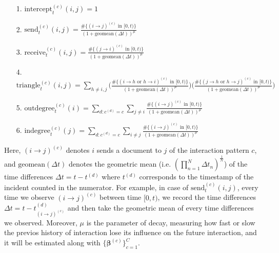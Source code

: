 \documentclass[a4paper]{article}
\begin{document}
 \begin{itemize}[leftmargin=*,rightmargin=-1cm]
 	\item [1.] $\mbox{intercept}^{(c)}_t(i, j) = 1$
 	\item [2.]  $\mbox{send}^{(c)}_t(i, j)= \frac{\#\{(i\rightarrow j)^{(c)} \mbox{ in } [0, t)\}}{(1+\mbox{geomean}(\Delta t))^\mu}$
 	\item [3.] $\mbox{receive}^{(c)}_t(i, j)=\frac{\#\{(j\rightarrow i)^{(c)} \mbox{ in } [0, t)\}}{(1+\mbox{geomean}(\Delta t))^\mu}$
 	\item [4.] $\mbox{triangle}^{(c)}_t(i, j)=\sum\limits_{h \neq i, j}\Big(\frac{\#\{(i\rightarrow h \mbox{ or } h \rightarrow i )^{(c)} \mbox{ in } [0, t)\}}{(1+\mbox{geomean}(\Delta t))^\mu}\Big)\Big(\frac{\#\{(j\rightarrow h \mbox{ or } h \rightarrow j )^{(c)} \mbox{ in } [0, t)\}}{(1+\mbox{geomean}(\Delta t))^\mu}\Big)$
 	\item [5.]  $\mbox{outdegree}^{(c)}_t(i)=\sum\limits_{d: c^{(d)}=c}\sum\limits_{j\neq i}\frac{\#\{(i\rightarrow j)^{(c)} \mbox{ in } [0, t)\}}{(1+\mbox{geomean}(\Delta t))^\mu}$
 	\item [6.] $\mbox{indegree}^{(c)}_t(j)=\sum\limits_{d: c^{(d)}=c}\sum\limits_{i \neq j}\frac{\#\{(i\rightarrow j)^{(c)} \mbox{ in } [0, t)\}}{(1+\mbox{geomean}(\Delta t))^\mu}$
 \end{itemize}
\vspace{3mm}
Here, $(i\rightarrow j)^{(c)}$ denotes $i$ sends a document to $j$ of the interaction pattern $c$, and $\mbox{geomean}(\Delta t)$ denotes the geometric mean (i.e. $(\prod\limits_{n=1}^N\Delta t_n)^{\frac{1}{N}}$) of the time differences $\Delta t=t-t^{(d)}$ where $t^{(d)}$ corresponds to the timestamp of the incident counted in the numerator. For example, in case of $\mbox{send}^{(c)}_t(i, j)$, every time we observe $(i\rightarrow j)^{(c)}$ between time $[0, t)$, we record the time differences $\Delta t=t-t_{(i\rightarrow j)^{(c)}}^{(d)}$ and then take the geometric mean of every time differences we observed. Moreover, $\mu$ is the parameter of decay, measuring how fast or slow the previos history of interaction lose its influence on the future interaction, and it will be estimated along with $\{\boldsymbol{\beta}^{(c)}\}_{c=1}^C$.
\end{document}
